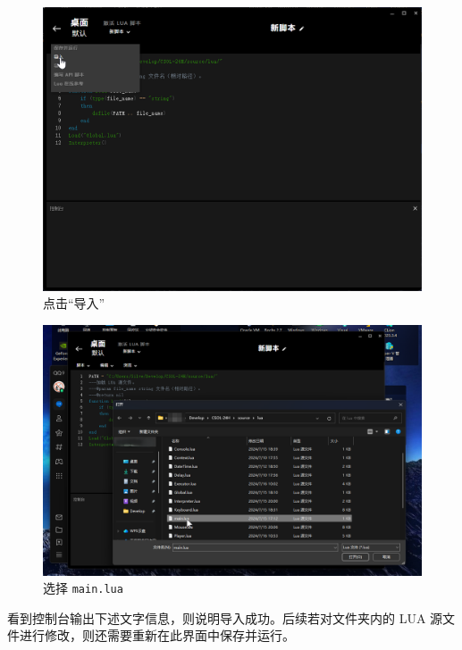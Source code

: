 \begin{figure}[H]
    \Centering
    \includegraphics[width=\textwidth]{docs/assets/import.png}
    \caption{点击“导入”}
\end{figure}

\begin{figure}[H]
    \Centering
    \includegraphics[width=\textwidth]{docs/assets/main.png}
    \caption{选择 \lstinline{main.lua}}
\end{figure}

看到控制台输出下述文字信息，则说明导入成功。后续若对文件夹内的 LUA 源文件进行修改，则还需要重新在此界面中保存并运行。

